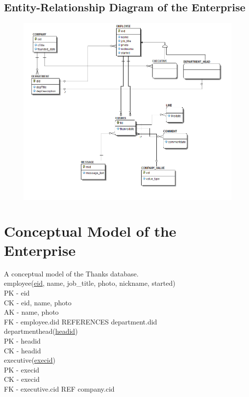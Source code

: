 \documentclass[11pt]{report}
\begin{document}
\subsection{Entity-Relationship Diagram of the Enterprise}

\begin{figure}[!htb]
\centering
\includegraphics[scale=.7]{./images/ERD11-4.png}
\end{figure}
\clearpage

\section{Conceptual Model of the Enterprise}
A conceptual model of the Thanks database. \\

employee(\underline{eid}, name, job\_title, photo, nickname, started) \\
PK - eid \\
CK - eid, name, photo \\
AK - name, photo \\
FK - employee.did REFERENCES department.did \\

departmenthead(\underline{headid}) \\
PK - headid \\
CK - headid \\

executive(\underline{execid}) \\
PK - execid \\
CK - execid \\
FK - executive.cid REF company.cid \\
\end{document}
